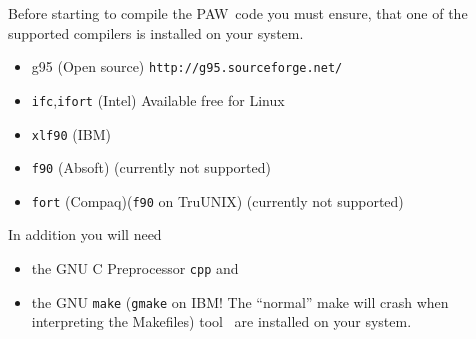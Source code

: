 \documentclass[a4paper,10pt]{article}
\newcommand{\PAW}{\textsc{PAW}}
\begin{document}
Before starting to compile the \PAW\ code you must ensure, that one of the
supported compilers is installed on your system.
\begin{itemize}
\item g95 (Open source) \texttt{http://g95.sourceforge.net/}
\item \texttt{ifc},\texttt{ifort} (Intel) Available free for Linux
\item \texttt{xlf90} (IBM)
\item  \texttt{f90} (Absoft) (currently not supported)
\item \texttt{fort} (Compaq)(\texttt{f90} on TruUNIX)  (currently not supported)
\end{itemize}

In addition you will need 
\begin{itemize}
\item the GNU C Preprocessor \texttt{cpp} and 
\item the GNU \texttt{make} (\texttt{gmake} on IBM! The ``normal''  make will crash when
interpreting the Makefiles) tool~\cite{make} are installed on your system.
\end{itemize}
\end{document}

